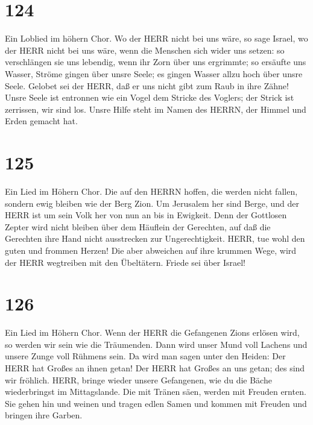 \hypertarget{section-123}{%
\section{124}\label{section-123}}

 Ein Loblied im höhern Chor. Wo der HERR nicht bei uns wäre,
so sage Israel,  wo der HERR nicht bei uns wäre, wenn die
Menschen sich wider uns setzen:  so verschlängen sie uns
lebendig, wenn ihr Zorn über uns ergrimmte;  so ersäufte uns
Wasser, Ströme gingen über unsre Seele;  es gingen Wasser
allzu hoch über unsre Seele.  Gelobet sei der HERR, daß er
uns nicht gibt zum Raub in ihre Zähne!  Unsre Seele ist
entronnen wie ein Vogel dem Stricke des Voglers; der Strick ist
zerrissen, wir sind los.  Unsre Hilfe steht im Namen des
HERRN, der Himmel und Erden gemacht hat.

\hypertarget{section-124}{%
\section{125}\label{section-124}}

 Ein Lied im Höhern Chor. Die auf den HERRN hoffen, die
werden nicht fallen, sondern ewig bleiben wie der Berg Zion.
 Um Jerusalem her sind Berge, und der HERR ist um sein Volk
her von nun an bis in Ewigkeit.  Denn der Gottlosen Zepter
wird nicht bleiben über dem Häuflein der Gerechten, auf daß die
Gerechten ihre Hand nicht ausstrecken zur Ungerechtigkeit. 
HERR, tue wohl den guten und frommen Herzen!  Die aber
abweichen auf ihre krummen Wege, wird der HERR wegtreiben mit den
Übeltätern. Friede sei über Israel!

\hypertarget{section-125}{%
\section{126}\label{section-125}}

 Ein Lied im Höhern Chor. Wenn der HERR die Gefangenen Zions
erlösen wird, so werden wir sein wie die Träumenden.  Dann
wird unser Mund voll Lachens und unsere Zunge voll Rühmens sein. Da wird
man sagen unter den Heiden: Der HERR hat Großes an ihnen getan!
 Der HERR hat Großes an uns getan; des sind wir fröhlich.
 HERR, bringe wieder unsere Gefangenen, wie du die Bäche
wiederbringst im Mittagslande.  Die mit Tränen säen, werden
mit Freuden ernten.  Sie gehen hin und weinen und tragen
edlen Samen und kommen mit Freuden und bringen ihre Garben.


